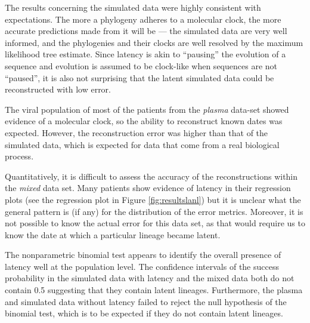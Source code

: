 \documentclass[12pt]{article}
\begin{document}
The results concerning the simulated data were highly consistent with expectations. 
The more a phylogeny adheres to a molecular clock, the more accurate predictions made from it will be --- the simulated data are very well informed, and the phylogenies and their clocks are well resolved by the maximum likelihood tree estimate. 
Since latency is akin to ``pausing'' the evolution of a sequence and evolution is assumed to be clock-like when sequences are not ``paused'', it is also not surprising that the latent simulated data could be reconstructed with low error. 

The viral population of most of the patients from the {\em plasma} data-set showed evidence of a molecular clock, so the ability to reconstruct known dates was expected.
However, the reconstruction error was higher than that of the simulated data, which is expected for data that come from a real biological process.

Quantitatively, it is difficult to assess the accuracy of the reconstructions within the {\em mixed} data set. 
Many patients show evidence of latency in their regression plots (see the regression plot in Figure \ref{fig:resultslanl}) but it is unclear what the general pattern is (if any) for the distribution of the error metrics. 
Moreover, it is not possible to know the actual error for this data set, as that would require us to know the date at which a particular lineage became latent. 

The nonparametric binomial test appears to identify the overall presence of latency well at the population level.
The confidence intervals of the success probability in the simulated data with latency and the mixed data both do not contain 0.5 suggesting that they contain latent lineages.
Furthermore, the plasma and simulated data without latency failed to reject the null hypothesis of the binomial test, which is to be expected if they do not contain latent lineages.

\end{document}
